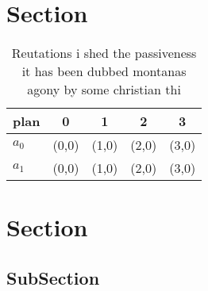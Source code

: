 \documentclass[a4paper]{article}
\begin{document}
\section{Section}

\begin{table}
\begin{adjustbox}{width=0.6\columnwidth}
\begin{tabular}{|l|l|l|l|l|}
\hline
\textbf{plan} & \multicolumn{1}{c|}{\textbf{0}} & \multicolumn{1}{c|}{\textbf{1}} & \multicolumn{1}{c|}{\textbf{2}} & \multicolumn{1}{c|}{\textbf{3}} \\ \hline
\textbf{$a_0$}  & (0,0) & (1,0) & (2,0) & (3,0) \\ \hline
\textbf{$a_1$}  & (0,0) & (1,0) & (2,0) & (3,0) \\ \hline
\end{tabular}
\end{adjustbox}
\caption{Reutations i shed the passiveness it has been dubbed montanas agony by some christian thi
}
\end{table}

\section{Section}

\subsection{SubSection}
\end{document}
